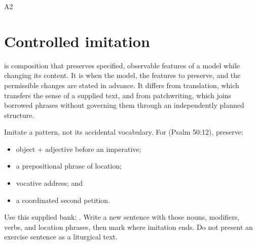 \begin{courseunit}{A2}
\section{Controlled imitation}

 is composition that preserves specified, observable features
of a model while changing its content. It is  when the model,
the features to preserve, and the permissible changes are stated in advance.
It differs from translation, which transfers the sense of a supplied text, and
from patchwriting, which joins borrowed phrases without governing them through
an independently planned structure.

Imitate a pattern, not its accidental vocabulary. For
 (Psalm 50:12), preserve:

\begin{itemize}
  \item object + adjective before an imperative;
  \item a prepositional phrase of location;
  \item vocative address; and
  \item a coordinated second petition.
\end{itemize}

Use this supplied bank: . Write a
new sentence with those nouns, modifiers, verbs, and location phrases, then
mark where imitation ends. Do not present an exercise sentence as a liturgical
text.



\end{courseunit}


